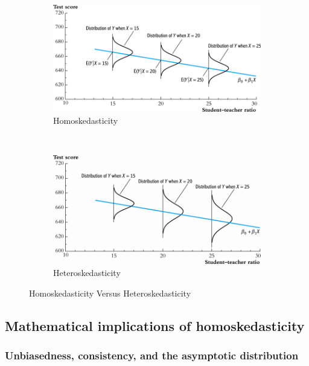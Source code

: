 \documentclass[a4paper,11pt]{article}
\begin{document}
\begin{figure}
    \centering
    \begin{subfigure}[!ht]{0.85\textwidth}
        \includegraphics[width=\textwidth]{./figure/fig-4-4}
        \caption{Homoskedasticity}
        \label{fig:homo1}
    \end{subfigure}
    ~ %
    \begin{subfigure}[!ht]{0.85\textwidth}
        \includegraphics[width=\textwidth]{./figure/fig-5-2}
        \caption{Heteroskedasticity}
        \label{fig:hetero1}
    \end{subfigure}
    \caption{Homoskedasticity Versus Heteroskedasticity}\label{fig:homovshetero}
\end{figure}


\subsection{Mathematical implications of homoskedasticity}
\label{sec:orgca1d9c8}

\subsubsection*{Unbiasedness, consistency, and the asymptotic distribution}
\label{sec:orgb777c04}
\end{document}

